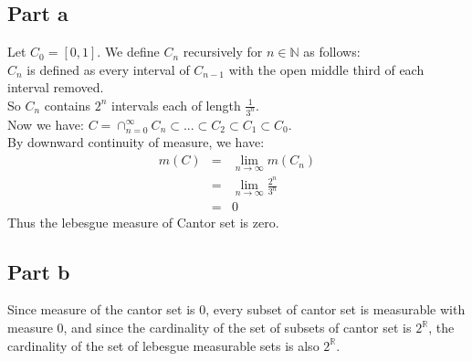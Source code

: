\documentclass[12pt]{article}
\begin{document}
\subsection*{Part a}
Let $C_0=[0,1]$. We define $C_n$ recursively for $n \in \mathbb{N}$ as follows: \\
$C_n$ is defined as every interval of $C_{n-1}$ with the open middle third of each interval removed. \\
So $C_n$ contains $2^{n}$ intervals each of length $\frac{1}{3^n}$.
\\
Now we have:
$C=\cap_{n=0}^{\infty} C_n \subset ... \subset C_2 \subset C_1 \subset C_0$. \\
By downward continuity of measure, we have: \\
\begin{eqnarray*}
m(C) &=& \lim_{n \rightarrow \infty} m(C_n)
\\ &=&
\lim_{n \rightarrow \infty} \frac{2^{n}}{3^n}
\\ &=&
0
\end{eqnarray*}
Thus the lebesgue measure of Cantor set is zero.
\subsection*{Part b}
Since measure of the cantor set is $0$, every subset of cantor set is measurable with measure $0$, and since the cardinality of the set of subsets of cantor set is $2^{\mathbb{R}}$, the cardinality of the set of lebesgue measurable sets is also $2^{\mathbb{R}}$.

\clearpage
\end{document}
